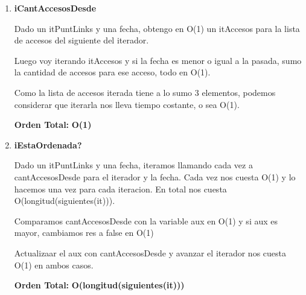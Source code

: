 \begin{enumerate}
\item\textbf{iCantAccesosDesde}
\par Dado un itPuntLinks y una fecha, obtengo en O(1) un itAccesos para la lista de accesos del siguiente del iterador.
\par Luego voy iterando itAccesos y si la fecha es menor o igual a la pasada, sumo la cantidad de accesos para ese acceso, todo en O(1).
\par Como la lista de accesos iterada tiene a lo sumo 3 elementos, podemos considerar que iterarla nos lleva tiempo costante, o sea O(1).
\par \textbf{Orden Total:} \textbf{O(1)}

\item\textbf{iEstaOrdenada?}
\par Dado un itPuntLinks y una fecha, iteramos llamando cada vez a cantAccesosDesde para el iterador y la fecha. Cada vez nos cuesta O(1) y lo hacemos una vez para cada iteracion. En total nos cuesta O(longitud(siguientes(it))).
\par Comparamos cantAccesosDesde con la variable aux en O(1) y si aux es mayor, cambiamos res a false en O(1)
\par Actualizaar el aux con cantAccesosDesde y avanzar el iterador nos cuesta O(1) en ambos casos.
\par \textbf{Orden Total:} \textbf{O(longitud(siguientes(it)))}

\end{enumerate}